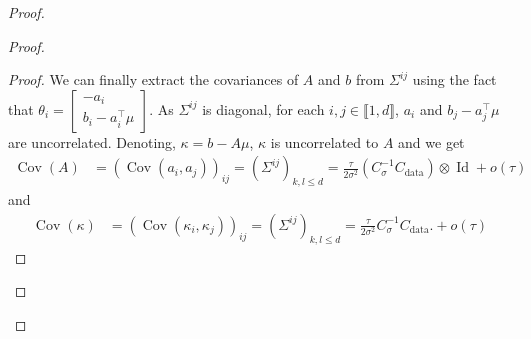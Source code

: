 \documentclass[11pt]{article}
\newcommand{\id}{\operatorname{Id}}
\newcommand{\RR}{\mathbb{R}}
\newcommand{\EE}{\mathbb{E}}
\newcommand{\cov}{\operatorname{Cov}}
\begin{document}
\begin{proof}
\begin{proof}
\begin{proof}
 
We can finally extract the covariances of $A$ and $b$ from $\Sigma^{ij}$ using the fact that $\theta_i =
\begin{bmatrix}
-a_i \\ b_i - a_i^\top \mu
\end{bmatrix}$.
As $\Sigma^{ij}$ is diagonal, for each $i,j \in \llbracket 1, d \rrbracket$, $a_i$ and $b_j - a_j^\top \mu$ are uncorrelated. Denoting, $\kappa =  b - A \mu$, $\kappa$ is uncorrelated to $A$ and we get
\begin{align*}
\cov(A) &= \left( \cov(a_i, a_j) \right)_{ij} = (\Sigma^{ij})_{k,l\leq d}= \frac{\tau}{2\sigma^2} (C_\sigma^{-1} C_\mathrm{data}) \otimes \id + o(\tau) 
\end{align*}
and
\begin{align*}
\cov(\kappa) &= \left( \cov(\kappa_i, \kappa_j) \right)_{ij} =(\Sigma^{ij})_{k,l\leq d}
= \frac{\tau}{2 \sigma^2} C_\sigma^{-1} C_\mathrm{data}.  %
+ o(\tau) 
\end{align*}
\end{proof}


\end{proof}
\end{proof}
\end{document}
